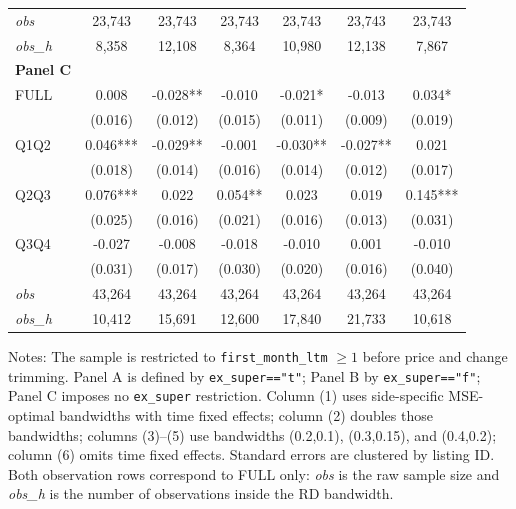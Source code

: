 \begin{table}[!htbp]
\begin{tabular}{lcccccc}
\textit{obs} & 23,743 & 23,743 & 23,743 & 23,743 & 23,743 & 23,743 \\
\textit{obs\_h} &  8,358 & 12,108 &  8,364 & 10,980 & 12,138 &  7,867 \\

\textbf{Panel C} &&&&&&  \\

FULL & 0.008 & -0.028** & -0.010 & -0.021* & -0.013 & 0.034* \\
 & (0.016) & (0.012) & (0.015) & (0.011) & (0.009) & (0.019) \\
Q1Q2 & 0.046*** & -0.029** & -0.001 & -0.030** & -0.027** & 0.021 \\
 & (0.018) & (0.014) & (0.016) & (0.014) & (0.012) & (0.017) \\
Q2Q3 & 0.076*** & 0.022 & 0.054** & 0.023 & 0.019 & 0.145*** \\
 & (0.025) & (0.016) & (0.021) & (0.016) & (0.013) & (0.031) \\
Q3Q4 & -0.027 & -0.008 & -0.018 & -0.010 & 0.001 & -0.010 \\
 & (0.031) & (0.017) & (0.030) & (0.020) & (0.016) & (0.040) \\

\textit{obs} & 43,264 & 43,264 & 43,264 & 43,264 & 43,264 & 43,264 \\
\textit{obs\_h} & 10,412 & 15,691 & 12,600 & 17,840 & 21,733 & 10,618 \\

\bottomrule
\end{tabular}
\begin{minipage}{0.98\textwidth}\footnotesize
Notes: The sample is restricted to \texttt{first\_month\_ltm} $\geq 1$ before price and change trimming. Panel A is defined by \texttt{ex\_super=="t"}; Panel B by \texttt{ex\_super=="f"}; Panel C imposes no \texttt{ex\_super} restriction. Column (1) uses side-specific MSE-optimal bandwidths with time fixed effects; column (2) doubles those bandwidths; columns (3)--(5) use bandwidths (0.2,0.1), (0.3,0.15), and (0.4,0.2); column (6) omits time fixed effects. Standard errors are clustered by listing ID. Both observation rows correspond to FULL only: \textit{obs} is the raw sample size and \textit{obs\_h} is the number of observations inside the RD bandwidth.
\end{minipage}
\end{table}
\clearpage

